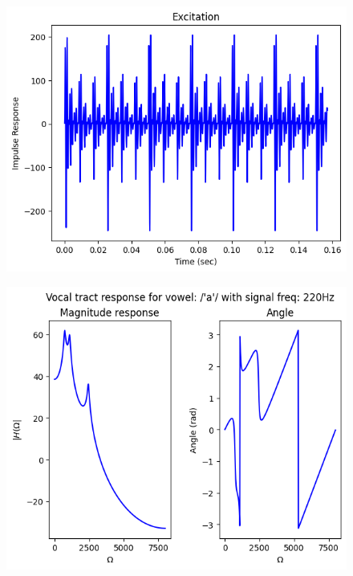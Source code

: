 \documentclass{article}
\begin{document}
\begin{figure}[H]
\begin{center}
\includegraphics[scale = 0.5]{Q4_A1R.png}
\end{center}
\end{figure}


\begin{figure}[H]
\begin{center}
\includegraphics[scale = 0.5]{Q4_A2.png}
\end{center}
\end{figure}
\end{document}
